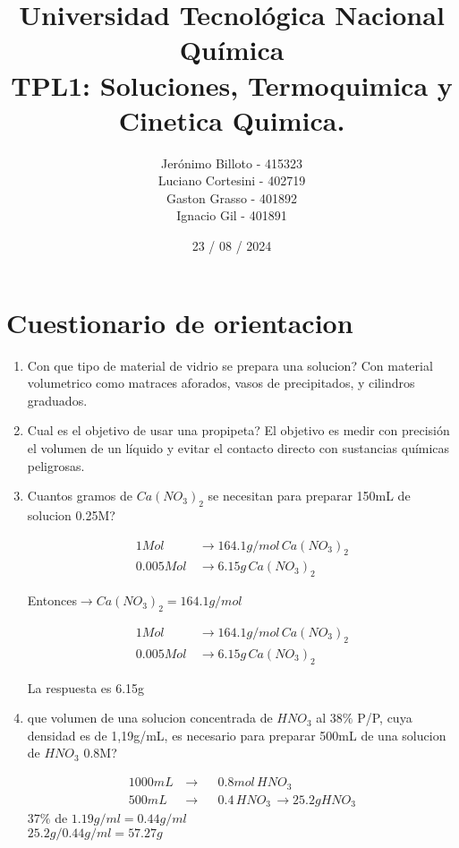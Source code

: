 \documentclass[12pt,a4paper]{report}
\title{%
  \fontsize{25}{0}\selectfont Universidad Tecnológica Nacional \\
  \fontsize{22}{30}\selectfont Química \\
  \fontsize{18}{25}\selectfont TPL1: Soluciones, Termoquimica y Cinetica Quimica.
}
\author{
  Jerónimo Billoto - 415323\\
  Luciano Cortesini - 402719\\
  Gaston Grasso - 401892\\
  Ignacio Gil - 401891\\
}
\date{23 / 08 / 2024}
\begin{document}
\maketitle
\section*{Cuestionario de orientacion}

\begin{enumerate}

  \item Con que tipo de material de vidrio se prepara una solucion?
    Con material volumetrico como matraces aforados, vasos de precipitados, y cilindros graduados.
  \item Cual es el objetivo de usar una propipeta?
    El objetivo es medir con precisión el volumen de un líquido y evitar el contacto directo con sustancias químicas peligrosas.
  \item Cuantos gramos de $Ca(NO_3)_2$ se necesitan para preparar 150mL de solucion 0.25M?

\begin{equation*}
\begin{aligned}
1 Mol  \, &\rightarrow 164.1g/mol \,Ca(NO_3)_2\\[6pt]
0.005 Mol  \, &\rightarrow 6.15g \,Ca(NO_3)_2
\end{aligned}
\end{equation*}

    Entonces$ \rightarrow Ca(NO_3)_2= 164.1 g/mol$

\begin{equation*}
\begin{aligned}
1 Mol  \, &\rightarrow 164.1g/mol \,Ca(NO_3)_2\\[6pt]
0.005 Mol  \, &\rightarrow 6.15g \,Ca(NO_3)_2
\end{aligned}
\end{equation*}

La respuesta es 6.15g\\
  \item que volumen de  una solucion concentrada de $HNO_3$ al $38\% $ P/P, cuya densidad es de 1,19g/mL, es necesario para preparar 500mL de una solucion de $HNO_3$ 0.8M?
 
    $$
    \begin{aligned}
    1000mL \,  &\rightarrow&& 0.8 mol \,HNO_3\\[6pt]
    500mL\,  &\rightarrow&& 0.4 \,HNO_3\, \rightarrow 25.2g HNO_3
    \end{aligned}
    $$
    $37\%$ de $1.19g/ml = 0.44g/ml$\\
    $25.2g/0.44g/ml=57.27g$\\

\end{enumerate}
\end{document}
